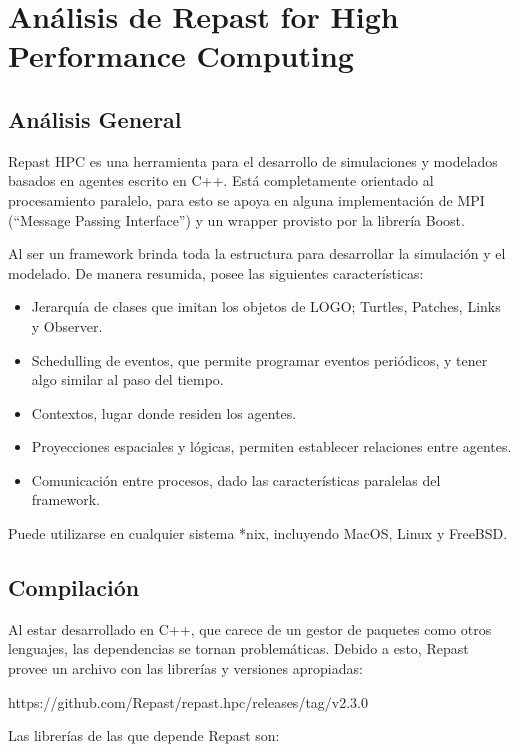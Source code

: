 \section{Análisis de Repast for High Performance Computing}

\subsection{Análisis General}

Repast HPC es una herramienta para el desarrollo de simulaciones y
modelados basados en agentes escrito en C++. Está completamente
orientado al procesamiento paralelo, para esto se apoya en alguna
implementación de MPI (``Message Passing Interface'') y un wrapper
provisto por la librería Boost.

Al ser un framework brinda toda la estructura para desarrollar la
simulación y el modelado. De manera resumida, posee las siguientes
características:

\begin{itemize}
	
	\item
	Jerarquía de clases que imitan los objetos de LOGO; Turtles, Patches,
	Links y Observer.
	\item
	Schedulling de eventos, que permite programar eventos periódicos, y
	tener algo similar al paso del tiempo.
	\item
	Contextos, lugar donde residen los agentes.
	\item
	Proyecciones espaciales y lógicas, permiten establecer relaciones
	entre agentes.
	\item
	Comunicación entre procesos, dado las características paralelas del
	framework.
\end{itemize}

Puede utilizarse en cualquier sistema *nix, incluyendo MacOS, Linux y
FreeBSD.

\subsection{Compilación}

Al estar desarrollado en C++, que carece de un gestor de paquetes como
otros lenguajes, las dependencias se tornan problemáticas. Debido a
esto, Repast provee un archivo con las librerías y versiones apropiadas:

https://github.com/Repast/repast.hpc/releases/tag/v2.3.0

Las librerías de las que depende Repast son:

